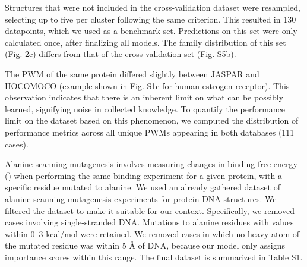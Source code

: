 \par
Structures that were not included in the cross-validation dataset were resampled, selecting up to five per cluster following the same criterion. This resulted in 130 datapoints, which we used as a benchmark set. Predictions on this set were only calculated once, after finalizing all models. The family distribution of this set (Fig. 2c) differs from that of the cross-validation set (Fig. S5b).
\par
The PWM of the same protein differed slightly between JASPAR and HOCOMOCO (example shown in Fig. S1c for human estrogen receptor). This observation indicates that there is an inherent limit on what can be possibly learned, signifying noise in collected knowledge. To quantify the performance limit on the dataset based on this phenomenon, we computed the distribution of performance metrics across all unique PWMs appearing in both databases (111 cases). 
\par
Alanine scanning mutagenesis involves measuring changes in binding free energy () when performing the same binding experiment for a given protein, with a specific residue mutated to alanine. We used an already gathered dataset \citep{Peng2018} of alanine scanning mutagenesis experiments for protein-DNA structures. We filtered the dataset to make it suitable for our context. Specifically, we removed cases involving single-stranded DNA. Mutations to alanine residues with  values within 0–3 kcal/mol were retained. We removed cases in which no heavy atom of the mutated residue was within 5 Å of DNA, because our model only assigns importance scores within this range. The final dataset is summarized in Table S1.
